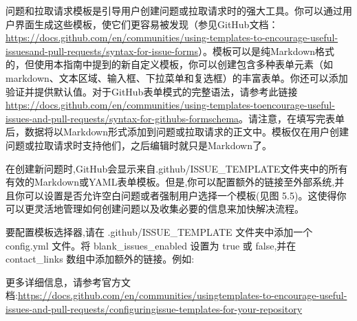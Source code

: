 
问题和拉取请求模板是引导用户创建问题或拉取请求时的强大工具。你可以通过用户界面生成这些模板，使它们更容易被发现（参见GitHub文档：\url{https://docs.github.com/en/communities/using-templates-to-encourage-useful-issuesand-pull-requests/syntax-for-issue-forms}）。模板可以是纯Markdown格式的，但使用本指南中提到的新自定义模板，你可以创建包含多种表单元素（如markdown、文本区域、输入框、下拉菜单和复选框）的丰富表单。你还可以添加验证并提供默认值。对于GitHub表单模式的完整语法，请参考此链接 \url{https://docs.github.com/en/communities/using-templates-toencourage-useful-issues-and-pull-requests/syntax-for-githubs-formschema}。请注意，在填写完表单后，数据将以Markdown形式添加到问题或拉取请求的正文中。模板仅在用户创建问题或拉取请求时支持他们，之后编辑时就只是Markdown了。


在创建新问题时,GitHub会显示来自.github/ISSUE\_TEMPLATE文件夹中的所有有效的Markdown或YAML表单模板。但是,你可以配置额外的链接至外部系统,并且你可以设置是否允许空白问题或者强制用户选择一个模板(见图 5.5)。这使得你可以更灵活地管理如何创建问题以及收集必要的信息来加快解决流程。

要配置模板选择器,请在 .github/ISSUE\_TEMPLATE 文件夹中添加一个 config.yml 文件。将 blank\_issues\_enabled 设置为 true 或 false,并在 contact\_links 数组中添加额外的链接。例如:


更多详细信息，请参考官方文档:\url{https://docs.github.com/en/communities/usingtemplates-to-encourage-useful-issues-and-pull-requests/configuringissue-templates-for-your-repository}


